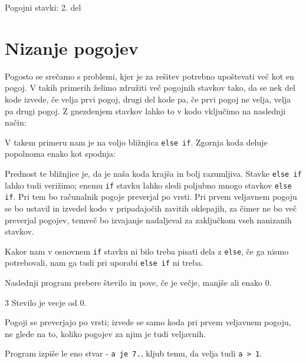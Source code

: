 
Pogojni stavki: 2. del


\section{Nizanje pogojev}

Pogosto se srečamo s problemi, kjer je za rešitev potrebno upoštevati več kot
en pogoj. V takih primerih želimo združiti več pogojnih stavkov tako, da se
nek del kode izvede, če velja prvi pogoj, drugi del kode pa, če prvi pogoj
ne velja, velja pa drugi pogoj. Z gnezdenjem stavkov lahko to v kodo vključimo
na naslednji način:


V takem primeru nam je na voljo bližnjica \verb+else if+. Zgornja koda deluje
popolnoma enako kot spodnja:


Prednost te bližnjice je, da je naša koda krajša in bolj razumljiva.
Stavke \verb+else if+ lahko tudi verižimo; enemu \verb+if+ stavku lahko sledi
poljubno mnogo stavkov \verb+else if+. Pri tem bo računalnik pogoje preverjal po
vrsti. Pri prvem veljavnem pogoju se bo ustavil in izvedel kodo v pripadajočih
zavitih oklepajih, za čimer ne bo več preverjal pogojev, temveč bo izvajanje
nadaljeval za zaključkom vseh nanizanih stavkov.

Kakor nam v osnovnem \verb+if+ stavku ni bilo treba pisati dela z \verb+else+,
če ga nismo potrebovali, nam ga tudi pri uporabi \verb+else if+ ni treba.

\pagebreak
\begin{examples}
Naslednji program prebere število in pove, če je večje, manjše ali enako 0.


\begin{inout}
3
\tcblower
Stevilo je vecje od 0.
\end{inout}

\end{examples}

\begin{examples}
Pogoji se preverjajo po vrsti; izvede se samo koda pri prvem veljavnem pogoju,
ne glede na to, koliko pogojev za njim je tudi veljavnih.


Program izpiše le eno stvar - \verb+a je 7.+, kljub temu, da velja tudi
\verb+a > 1+.

\end{examples}


